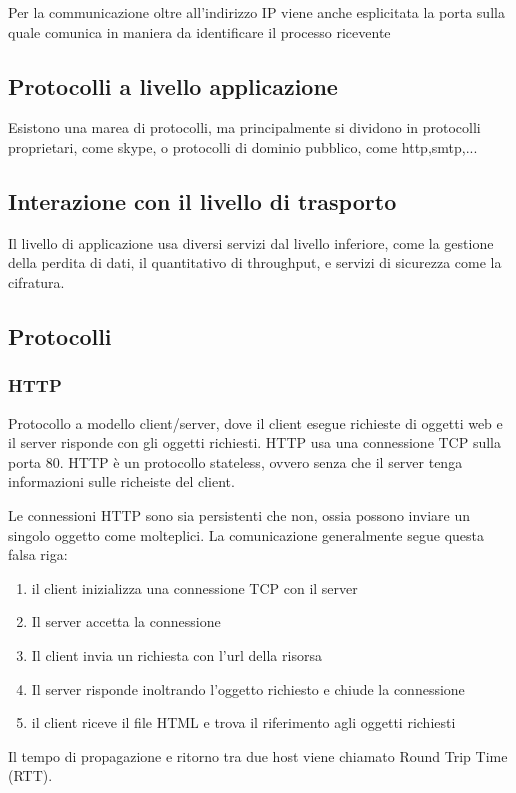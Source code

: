 \documentclass[12pt, a4paper]{article}
\begin{document}
Per la communicazione oltre all'indirizzo IP viene anche esplicitata la porta sulla quale comunica in maniera da identificare
il processo ricevente

\subsection{Protocolli a livello applicazione}
Esistono una marea di protocolli, ma principalmente si dividono in protocolli proprietari, come skype, o protocolli
di dominio pubblico, come http,smtp,...

\subsection{Interazione con il livello di trasporto}
Il livello di applicazione usa diversi servizi dal livello inferiore, come la gestione della perdita di dati, il quantitativo
di throughput, e servizi di sicurezza come la cifratura.

\subsection{Protocolli}
\subsubsection{HTTP}
Protocollo a modello client/server, dove il client esegue richieste di oggetti web e il server risponde con gli oggetti richiesti.
HTTP usa una connessione TCP sulla porta 80. HTTP è un protocollo stateless, ovvero senza che il server tenga informazioni sulle
richeiste del client.

Le connessioni HTTP sono sia persistenti che non, ossia possono inviare un singolo oggetto come molteplici. La comunicazione
generalmente segue questa falsa riga:
\begin{enumerate}
    \item il client inizializza una connessione TCP con il server
    \item Il server accetta la connessione
    \item Il client invia un richiesta con l'url della risorsa
    \item Il server risponde inoltrando l'oggetto richiesto e chiude la connessione
    \item il client riceve il file HTML e trova il riferimento agli oggetti richiesti
\end{enumerate}
Il tempo di propagazione e ritorno tra due host viene chiamato Round Trip Time (RTT).
\end{document}
